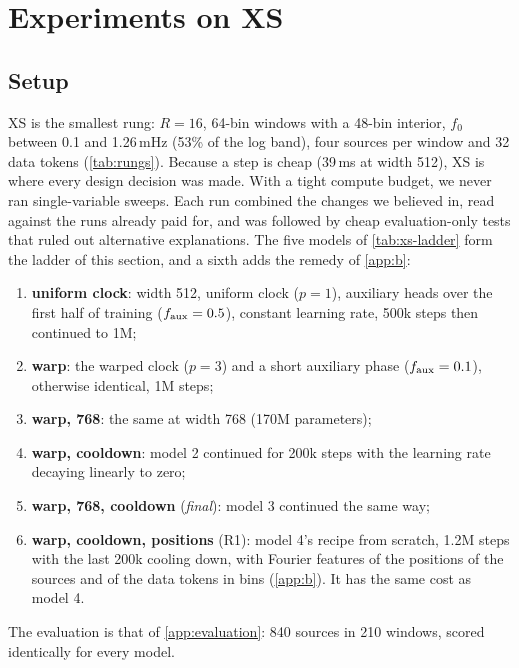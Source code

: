 \section{Experiments on XS}
\label{app:xs}

\subsection{Setup}

XS is the smallest rung: $R=16$, 64-bin windows with a 48-bin interior, $f_0$ between 0.1 and
1.26\,mHz (53\% of the log band), four sources per window and 32 data tokens
(\cref{tab:rungs}). Because a step is cheap (39\,ms at width 512), XS is where every design
decision was made. With a tight compute budget, we never ran single-variable sweeps. Each
run combined the changes we believed in, read against the runs already paid for, and was
followed by cheap evaluation-only tests that ruled out alternative explanations. The five
models of \cref{tab:xs-ladder} form the ladder of this section, and a sixth adds the remedy of
\cref{app:b}:
\begin{enumerate}
  \item \textbf{uniform clock}: width 512, uniform clock ($p=1$), auxiliary heads over the
        first half of training ($f_{\rm aux}=0.5$), constant learning rate, 500k steps then
        continued to 1M;
  \item \textbf{warp}: the warped clock ($p=3$) and a short auxiliary phase
        ($f_{\rm aux}=0.1$), otherwise identical, 1M steps;
  \item \textbf{warp, 768}: the same at width 768 (170M parameters);
  \item \textbf{warp, cooldown}: model 2 continued for 200k steps with the learning rate
        decaying linearly to zero;
  \item \textbf{warp, 768, cooldown} (\emph{final}): model 3 continued the same way;
  \item \textbf{warp, cooldown, positions} (R1): model 4's recipe from scratch, 1.2M steps with
        the last 200k cooling down, with Fourier features of the positions of the sources and
        of the data tokens in bins (\cref{app:b}). It has the same cost as model 4.
\end{enumerate}
The evaluation is that of \cref{app:evaluation}: 840 sources in 210 windows, scored
identically for every model.

